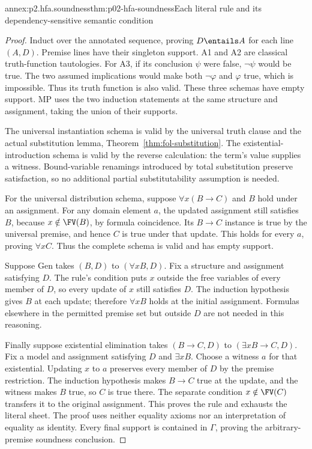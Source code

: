 \begin{annexitem}{annex:p2.hfa.soundness}{thm:p02-hfa-soundness}{Each literal rule and its dependency-sensitive semantic condition}
\begin{proof}
Induct over the annotated sequence, proving \(D\entails A\) for
each line \((A,D)\). Premise lines have their singleton support.
A1 and A2 are classical truth-function tautologies. For A3, if its
conclusion \(\psi\) were false, \(\neg\psi\) would be true.
The two assumed implications would make both \(\neg\varphi\)
and \(\varphi\) true, which is impossible. Thus its truth function
is also valid. These three schemas have empty support. MP uses the
two induction statements at the same structure and assignment, taking
the union of their supports.

The universal instantiation schema is valid by the universal truth
clause and the actual substitution lemma, Theorem~\ref{thm:fol-substitution}.
The existential-introduction schema is valid by the reverse calculation:
the term's value supplies a witness. Bound-variable renamings introduced
by total substitution preserve satisfaction, so no additional partial
substitutability assumption is needed.

For the universal distribution schema, suppose \(\forall x(B\to C)\)
and \(B\) hold under an assignment. For any domain element \(a\),
the updated assignment still satisfies \(B\), because
\(x\notin\FV(B)\), by formula coincidence. Its \(B\to C\)
instance is true by the universal premise, and hence \(C\) is true
under that update. This holds for every \(a\), proving \(\forall xC\).
Thus the complete schema is valid and has empty support.

Suppose Gen takes \((B,D)\) to \((\forall xB,D)\).
Fix a structure and assignment satisfying \(D\). The rule's condition
puts \(x\) outside the free variables of every member of \(D\),
so every update of \(x\) still satisfies \(D\). The induction
hypothesis gives \(B\) at each update; therefore \(\forall xB\)
holds at the initial assignment. Formulas elsewhere in the permitted
premise set but outside \(D\) are not needed in this reasoning.

Finally suppose existential elimination takes \((B\to C,D)\)
to \((\exists xB\to C,D)\). Fix a model and assignment satisfying
\(D\) and \(\exists xB\). Choose a witness \(a\) for that
existential. Updating \(x\) to \(a\) preserves every member of
\(D\) by the premise restriction. The induction hypothesis makes
\(B\to C\) true at the update, and the witness makes \(B\)
true, so \(C\) is true there. The separate condition
\(x\notin\FV(C)\) transfers it to the original assignment.
This proves the rule and exhausts the literal sheet. The proof uses
neither equality axioms nor an interpretation of equality as identity.
Every final support is contained in \(\Gamma\), proving the
arbitrary-premise soundness conclusion.
\end{proof}
\end{annexitem}

